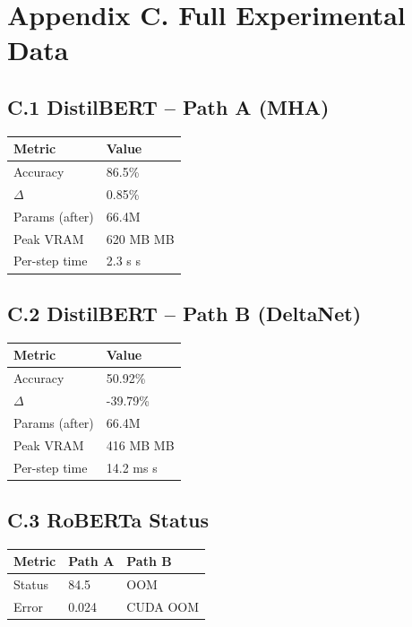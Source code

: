 
\section{Appendix C. Full Experimental Data}

\subsection{C.1 DistilBERT -- Path A (MHA)}

\begin{table}[H]
\centering
\small
\begin{tabular}{ll}
\toprule
\textbf{Metric} & \textbf{Value} \\
\midrule
Accuracy & 86.5\% \\
$\Delta$ & 0.85\% \\
Params (after) & 66.4M \\
Peak VRAM & 620 MB MB \\
Per-step time & 2.3 s s \\
\bottomrule
\end{tabular}
\end{table}

\subsection{C.2 DistilBERT -- Path B (DeltaNet)}

\begin{table}[H]
\centering
\small
\begin{tabular}{ll}
\toprule
\textbf{Metric} & \textbf{Value} \\
\midrule
Accuracy & 50.92\% \\
$\Delta$ & -39.79\% \\
Params (after) & 66.4M \\
Peak VRAM & 416 MB MB \\
Per-step time & 14.2 ms s \\
\bottomrule
\end{tabular}
\end{table}

\subsection{C.3 RoBERTa Status}

\begin{table}[H]
\centering
\small
\begin{tabular}{lll}
\toprule
\textbf{Metric} & \textbf{Path A} & \textbf{Path B} \\
\midrule
Status & 84.5 & OOM \\
Error & 0.024 & CUDA OOM \\
\bottomrule
\end{tabular}
\end{table}

